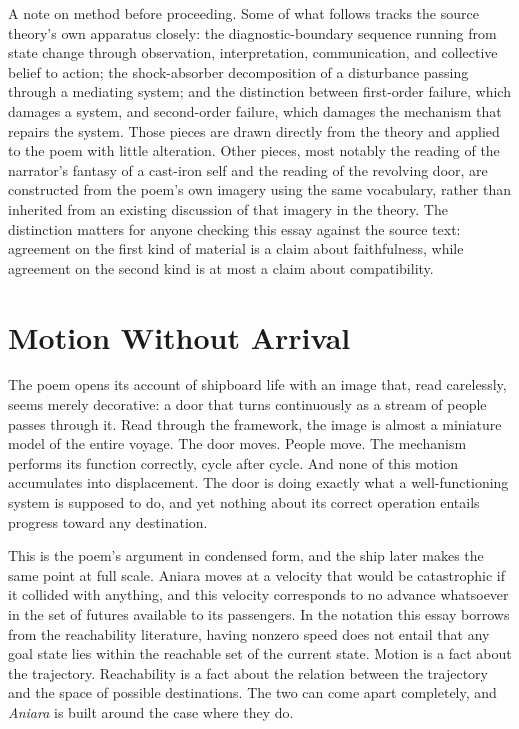 \documentclass[11pt]{article}
\begin{document}
A note on method before proceeding. Some of what follows tracks the source theory's own apparatus closely: the diagnostic-boundary sequence running from state change through observation, interpretation, communication, and collective belief to action; the shock-absorber decomposition of a disturbance passing through a mediating system; and the distinction between first-order failure, which damages a system, and second-order failure, which damages the mechanism that repairs the system. Those pieces are drawn directly from the theory and applied to the poem with little alteration. Other pieces, most notably the reading of the narrator's fantasy of a cast-iron self and the reading of the revolving door, are constructed from the poem's own imagery using the same vocabulary, rather than inherited from an existing discussion of that imagery in the theory. The distinction matters for anyone checking this essay against the source text: agreement on the first kind of material is a claim about faithfulness, while agreement on the second kind is at most a claim about compatibility.

\section{Motion Without Arrival}

The poem opens its account of shipboard life with an image that, read carelessly, seems merely decorative: a door that turns continuously as a stream of people passes through it. Read through the framework, the image is almost a miniature model of the entire voyage. The door moves. People move. The mechanism performs its function correctly, cycle after cycle. And none of this motion accumulates into displacement. The door is doing exactly what a well-functioning system is supposed to do, and yet nothing about its correct operation entails progress toward any destination.

This is the poem's argument in condensed form, and the ship later makes the same point at full scale. Aniara moves at a velocity that would be catastrophic if it collided with anything, and this velocity corresponds to no advance whatsoever in the set of futures available to its passengers. In the notation this essay borrows from the reachability literature, having nonzero speed does not entail that any goal state lies within the reachable set of the current state. Motion is a fact about the trajectory. Reachability is a fact about the relation between the trajectory and the space of possible destinations. The two can come apart completely, and \emph{Aniara} is built around the case where they do.
\end{document}

